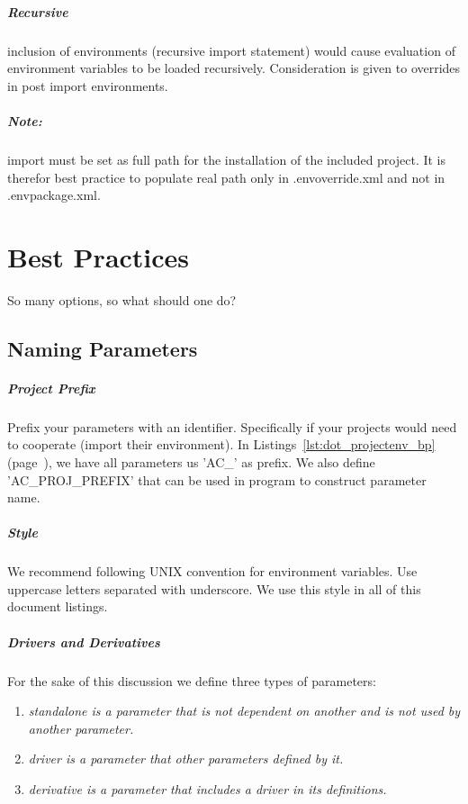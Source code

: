 \documentclass[design.tex]{subfiles}
\begin{document}
\paragraph{Recursive} inclusion of environments (recursive import statement) would cause evaluation of environment variables to be loaded recursively.  Consideration is given to overrides in post import environments.

\paragraph{Note:}import must be set as full path for the installation of the included project.  It is therefor best practice to populate real path only in .envoverride.xml and not in .envpackage.xml.

\chapter{Best Practices}
So many options, so what should one do?

\section{Naming Parameters}
\paragraph{Project Prefix}
Prefix your parameters with an identifier.  Specifically if your projects would need to cooperate (import their environment).  In Listings~\ref{lst:dot_projectenv_bp} (page~\pageref{lst:dot_projectenv_bp}), we have all parameters us 'AC\_' as prefix.  We also define 'AC\_PROJ\_PREFIX' that can be used in program to construct parameter name.

\paragraph{Style} We recommend following UNIX convention for environment variables.  Use uppercase letters separated with underscore.  We use this style in all of this document listings.

\paragraph{Drivers and Derivatives}
For the sake of this discussion we define three types of parameters:
\begin{enumerate}
	\item \em{standalone} is a parameter that is not dependent on another and is not used by another parameter.
	\item \em{driver} is a parameter that other parameters defined by it.
	\item \em{derivative} is a parameter that includes a driver in its definitions.
\end{enumerate}
\end{document}
